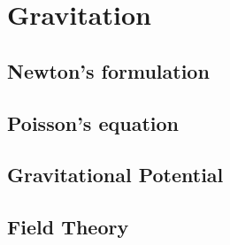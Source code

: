 \section{Gravitation}
\label{sec:gravitation}

\subsection{Newton's formulation}
\label{subsec:gravity-newton}

\subsection{Poisson's equation}
\label{subsec:gravity-poisson}

\subsection{Gravitational Potential}
\label{subsec:gravitational-potential}

\subsection{Field Theory}
\label{subsec:field-theory}




